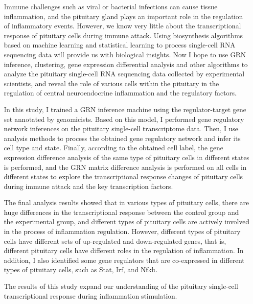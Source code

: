 \begin{abstract*}
  Immune challenges such as viral or bacterial infections can cause tissue inflammation, and the pituitary gland plays an important role in the regulation of inflammatory events. However, we know very little about the transcriptional response of pituitary cells during immune attack. Using biosynthesis algorithms based on machine learning and statistical learning to process single-cell RNA sequencing data will provide us with biological insights. Now I hope to use GRN inference, clustering, gene expression differential analysis and other algorithms to analyze the pituitary single-cell RNA sequencing data collected by experimental scientists, and reveal the role of various cells within the pituitary in the regulation of central neuroendocrine inflammation and the regulatory factors.

  In this study, I trained a GRN inference machine using the regulator-target gene set annotated by genomicists. Based on this model, I performed gene regulatory network inferences on the pituitary single-cell transcriptome data. Then, I use analysis methods to process the obtained gene regulatory network and infer its cell type and state. Finally, according to the obtained cell label, the gene expression difference analysis of the same type of pituitary cells in different states is performed, and the GRN matrix difference analysis is performed on all cells in different states to explore the transcriptional response changes of pituitary cells during immune attack and the key transcription factors.

  The final analysis results showed that in various types of pituitary cells, there are huge differences in the transcriptional response between the control group and the experimental group, and different types of pituitary cells are actively involved in the process of inflammation regulation. However, different types of pituitary cells have different sets of up-regulated and down-regulated genes, that is, different pituitary cells have different roles in the regulation of inflammation. In addition, I also identified some gene regulators that are co-expressed in different types of pituitary cells, such as Stat, Irf, and Nfkb.

  The results of this study expand our understanding of the pituitary single-cell transcriptional response during inflammation stimulation.
\end{abstract*}

